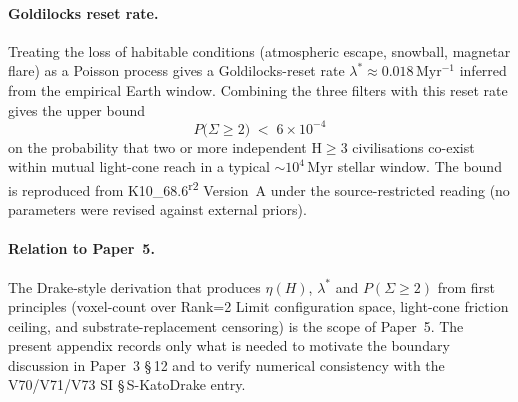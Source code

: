 \documentclass[11pt]{article}
\begin{document}
\paragraph{Goldilocks reset rate.} Treating the loss of habitable conditions (atmospheric escape, snowball, magnetar flare) as a Poisson process gives a Goldilocks-reset rate $\lambda^{*}\!\approx\!0.018\,\mathrm{Myr^{-1}}$ inferred from the empirical Earth window. Combining the three filters with this reset rate gives the upper bound
\begin{equation*}
  P\!\bigl(\Sigma\geq 2\bigr) \;<\; 6\times 10^{-4}
\end{equation*}
on the probability that two or more independent H$\geq 3$ civilisations co-exist within mutual light-cone reach in a typical $\sim\!10^{4}\,\mathrm{Myr}$ stellar window. The bound is reproduced from K10\_68.6\textsuperscript{r2} Version~A under the source-restricted reading (no parameters were revised against external priors).

\paragraph{Relation to Paper~5.} The Drake-style derivation that produces $\eta(H)$, $\lambda^{*}$ and $P(\Sigma\geq 2)$ from first principles (voxel-count over Rank=2 Limit configuration space, light-cone friction ceiling, and substrate-replacement censoring) is the scope of Paper~5. The present appendix records only what is needed to motivate the boundary discussion in Paper~3 \S\,12 and to verify numerical consistency with the V70/V71/V73 SI \S\,S-KatoDrake entry.
\end{document}
